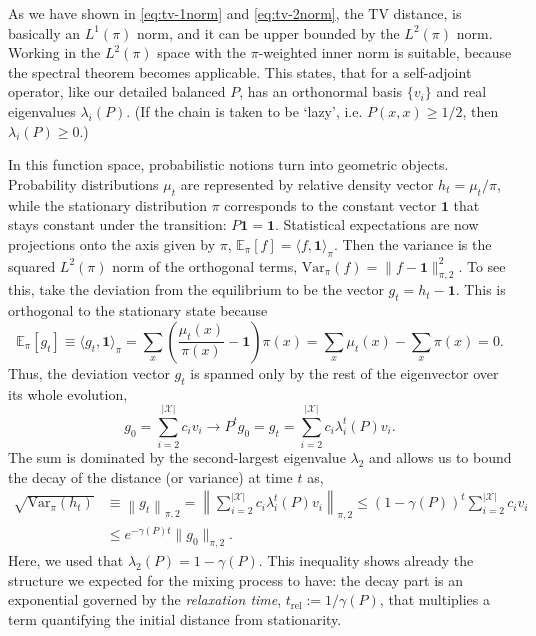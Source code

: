 As we have shown in \eqref{eq:tv-1norm} and \eqref{eq:tv-2norm}, the TV distance, is basically an $L^1(\pi)$ norm, and it can be upper bounded by the $L^2(\pi)$ norm. Working in the $L^2(\pi)$ space with the $\pi$-weighted inner norm is suitable, because the spectral theorem becomes applicable. This states, that for a self-adjoint operator, like our detailed balanced $P$, has an orthonormal basis $\{v_i\}$ and real eigenvalues $\lambda_i(P)$. (If the chain is taken to be `lazy', i.e. $P(x, x)\geq 1/2$, then $\lambda_i(P) \geq 0$.) 

In this function space, probabilistic notions turn into geometric objects. Probability distributions $\mu_t$ are represented by relative density vector $h_t = \mu_t / \pi$, while the stationary distribution $\pi$ corresponds to the constant vector $\mathbf{1}$ that stays constant under the transition: $P \mathbf{1} = \mathbf{1}$. Statistical expectations are now projections onto the axis given by $\pi$, $\mathbb{E}_\pi [f] = \langle f, \mathbf{1} \rangle_\pi$. Then the variance is the squared $L^2(\pi)$ norm of the orthogonal terms, $\text{Var}_\pi(f) = \|f - \mathbf{1}\|_{\pi, 2} ^2$. To see this, take the deviation from the equilibrium to be the vector $g_t = h_t - \mathbf{1}$. This is orthogonal to the stationary state because
\begin{equation}
    \mathbb{E}_\pi[g_t] \equiv \langle g_t, \mathbf{1} \rangle_\pi = \sum_x \left(\frac{\mu_t(x)}{\pi(x)}- \mathbf{1}\right) \pi(x) = \sum_x \mu_t(x) - \sum_x \pi(x) = 0.
\end{equation}
Thus, the deviation vector $g_t$ is spanned only by the rest of the eigenvector over its whole evolution,
\begin{equation}
    g_0 = \sum_{i=2}^{|\mathcal{X}|} c_i v_i \rightarrow P^t g_0 = g_t = \sum_{i=2}^{|\mathcal{X}|} c_i \lambda^t_i(P) v_i.
\end{equation}
The sum is dominated by the second-largest eigenvalue $\lambda_2$ and allows us to bound the decay of the distance (or variance) at time $t$ as,
\begin{equation}
    \begin{split}
        \sqrt{\text{Var}_\pi(h_t)} &\equiv \left\|g_t\right\|_{\pi, 2}  = \left\|\sum_{i=2}^{|\mathcal{X}|} c_i \lambda_i^t(P) v_i\right\|_{\pi, 2}\leq (1-\gamma(P))^t\sum_{i=2}^{|\mathcal{X}|} c_i v_i \\
        &\leq e^{-\gamma(P) t} \|g_0\|_{\pi, 2}.
    \end{split}
\end{equation}
Here, we used that $\lambda_2(P) = 1 - \gamma(P)$. This inequality shows already the structure we expected for the mixing process to have: the decay part is an exponential governed by the \textit{relaxation time}, $t_\text{rel} := 1 / \gamma(P)$, that multiplies a term quantifying the initial distance from stationarity. 

